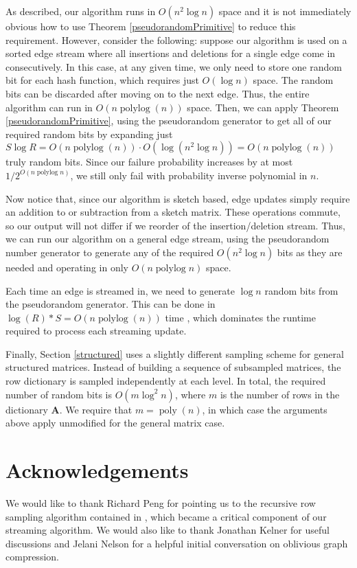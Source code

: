 \documentclass[11pt]{article}
\newcommand{\bv}[1]{\mathbf{#1}}
\newcommand{\plog}{\mathop\mathrm{polylog}}
\newcommand{\poly}{\mathop\mathrm{poly}}
\begin{document}
As described, our algorithm runs in $O(n^2 \log n)$ space and it is not immediately obvious how to use Theorem \ref{pseudorandomPrimitive} to reduce this requirement.
However, consider the following: suppose our algorithm is used on a sorted edge stream where all insertions and deletions for a single edge come in consecutively. In this case, at any given time, we only need to store one random bit for each hash function, which requires just $O(\log n)$ space. The random bits can be discarded after moving on to the next edge. Thus, the entire algorithm can run in $O(n \plog(n))$ space. Then, we can apply Theorem \ref{pseudorandomPrimitive}, using the pseudorandom generator to get all of our required random bits by expanding just $S\log R = O(n \plog(n)) \cdot O(\log(n^2 \log n)) =  O(n \plog(n))$ truly random bits. 
Since our failure probability increases by at most $1/2^{O(n\plog n)}$, we still only fail with probability inverse polynomial in $n$. 

Now notice that, since our algorithm is sketch based, edge updates simply require an addition to or subtraction from a sketch matrix. These operations commute, so our output will not differ if we reorder of the insertion/deletion stream. Thus, we can run our algorithm on a general edge stream, using the pseudorandom number generator to generate any of the required $O(n^2 \log n)$ bits as they are needed and operating in only $O(n \plog n)$ space.

Each time an edge is streamed in, we need to generate $\log n$ random bits from the pseudorandom generator. This can be done in $\log(R)*S = O(n\plog(n))$ time \cite{indyk2000stable}, which dominates the runtime required to process each streaming update.

Finally, Section \ref{structured} uses a slightly different sampling scheme for general structured matrices. Instead of building a sequence of subsampled matrices, the row dictionary is sampled independently at each level. In total, the required number of random bits is $O(m\log^2n)$, where $m$ is the number of rows in the dictionary $\bv{A}$. We require that $m = \poly(n)$, in which case the arguments above apply unmodified for the general matrix case.







\section{Acknowledgements}
We would like to thank Richard Peng for pointing us to the recursive row sampling algorithm contained in \cite{pengV1}, which became a critical component of our streaming algorithm. 
We would also like to thank Jonathan Kelner for useful discussions and Jelani Nelson for a helpful initial conversation on oblivious graph compression.
\end{document}
